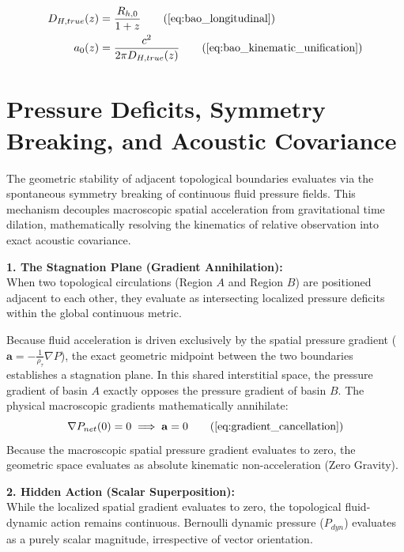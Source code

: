 \documentclass[11pt, a4paper]{article}
\begin{document}
\begin{tcolorbox}[recallbox, title={\ref{box:bao_lensing}. Baryon Acoustic Oscillations \& Kinematic Unification}]
\begin{align}
    D_{H,true}(z) &= \frac{R_{h,0}}{1+z} \tag{\ref{eq:bao_longitudinal}} \\
    a_0(z) &= \frac{c^2}{2\pi D_{H,true}(z)} \tag{\ref{eq:bao_kinematic_unification}}
\end{align}
\end{tcolorbox}


\section{Pressure Deficits, Symmetry Breaking, and Acoustic Covariance}
\label{sec:deriv_auxetic_symmetry_covariance}

The geometric stability of adjacent topological boundaries evaluates via the spontaneous symmetry breaking of continuous fluid pressure fields. This mechanism decouples macroscopic spatial acceleration from gravitational time dilation, mathematically resolving the kinematics of relative observation into exact acoustic covariance.

\textbf{1. The Stagnation Plane (Gradient Annihilation):} \\
When two topological circulations (Region $A$ and Region $B$) are positioned adjacent to each other, they evaluate as intersecting localized pressure deficits within the global continuous metric. 

Because fluid acceleration is driven exclusively by the spatial pressure gradient ($\mathbf{a} = -\frac{1}{\rho_{\tau}} \nabla P$), the exact geometric midpoint between the two boundaries establishes a stagnation plane. In this shared interstitial space, the pressure gradient of basin $A$ exactly opposes the pressure gradient of basin $B$. The physical macroscopic gradients mathematically annihilate:
\begin{equation}
    \nabla P_{net}(0) = 0 \implies \mathbf{a} = 0 \tag{\ref{eq:gradient_cancellation}}
\end{equation}
Because the macroscopic spatial pressure gradient evaluates to zero, the geometric space evaluates as absolute kinematic non-acceleration (Zero Gravity).

\textbf{2. Hidden Action (Scalar Superposition):} \\
While the localized spatial gradient evaluates to zero, the topological fluid-dynamic action remains continuous. Bernoulli dynamic pressure ($P_{dyn}$) evaluates as a purely scalar magnitude, irrespective of vector orientation. 
\end{document}
